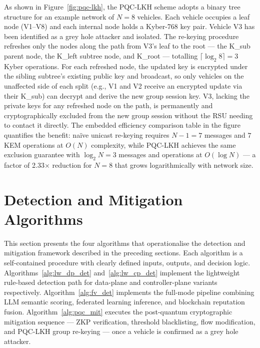 \documentclass[12pt, a4paper]{report}
\begin{document}
As shown in Figure~\ref{fig:pqc-lkh}, the PQC-LKH scheme adopts a binary tree structure for an example network of $N=8$ vehicles. Each vehicle occupies a leaf node (V1--V8) and each internal node holds a Kyber-768 key pair. Vehicle V3 has been identified as a grey hole attacker and isolated. The re-keying procedure refreshes only the nodes along the path from V3's leaf to the root — the K\_sub parent node, the K\_left subtree node, and K\_root — totalling $\lceil\log_2 8\rceil = 3$ Kyber operations. For each refreshed node, the updated key is encrypted under the sibling subtree's existing public key and broadcast, so only vehicles on the unaffected side of each split (e.g., V1 and V2 receive an encrypted update via their K\_sub) can decrypt and derive the new group session key. V3, lacking the private keys for any refreshed node on the path, is permanently and cryptographically excluded from the new group session without the RSU needing to contact it directly. The embedded efficiency comparison table in the figure quantifies the benefit: naïve unicast re-keying requires $N-1 = 7$ messages and $7$ KEM operations at $O(N)$ complexity, while PQC-LKH achieves the same exclusion guarantee with $\log_2 N = 3$ messages and operations at $O(\log N)$ — a factor of 2.33$\times$ reduction for $N=8$ that grows logarithmically with network size.


\section{Detection and Mitigation Algorithms}
\label{sec:algorithms}

This section presents the four algorithms that operationalise the detection and
mitigation framework described in the preceding sections. Each algorithm is a
self-contained procedure with clearly defined inputs, outputs, and decision
logic. Algorithms~\ref{alg:lw_dp_det} and~\ref{alg:lw_cp_det} implement the
lightweight rule-based detection path for data-plane and controller-plane
variants respectively. Algorithm~\ref{alg:fv_det} implements the full-mode
pipeline combining LLM semantic scoring, federated learning inference, and
blockchain reputation fusion. Algorithm~\ref{alg:pqc_mit} executes the
post-quantum cryptographic mitigation sequence — ZKP verification, threshold
blacklisting, flow modification, and PQC-LKH group re-keying — once a vehicle
is confirmed as a grey hole attacker.
\end{document}
